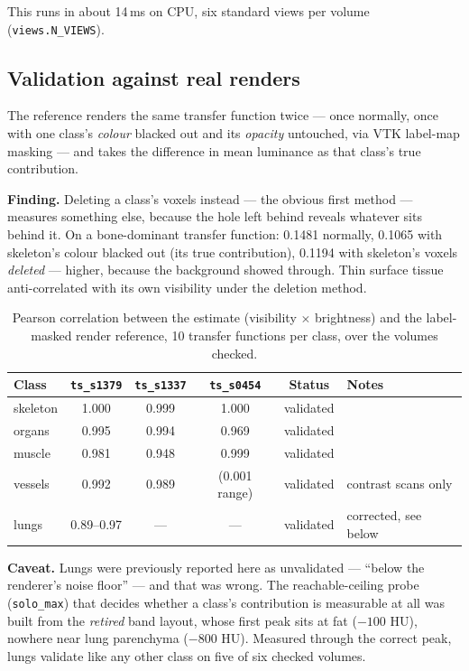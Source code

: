 \documentclass[10pt]{article}
\newcommand{\finding}[1]{\begin{findingbox}\textbf{Finding.} #1\end{findingbox}}
\newcommand{\caveattext}[1]{\begin{findingbox}[colframe=black!30]\textbf{Caveat.} #1\end{findingbox}}
\newcommand{\code}[1]{\texttt{#1}}
\begin{document}
This runs in about 14\,ms on CPU, six standard views per volume (\code{views.N\_VIEWS}).

\subsection{Validation against real renders}
\label{sec:validation}

The reference renders the same transfer function twice --- once normally,
once with one class's \emph{colour} blacked out and its \emph{opacity}
untouched, via VTK label-map masking --- and takes the difference in mean
luminance as that class's true contribution.

\finding{Deleting a class's voxels instead --- the obvious first method ---
measures something else, because the hole left behind reveals whatever sits
behind it. On a bone-dominant transfer function: 0.1481 normally, 0.1065 with
skeleton's colour blacked out (its true contribution), 0.1194 with
skeleton's voxels \emph{deleted} --- higher, because the background showed
through. Thin surface tissue anti-correlated with its own visibility under
the deletion method.}

\begin{table}[h]
\centering\small
\begin{tabular}{@{}lccccl@{}}
\toprule
\textbf{Class} & \code{ts\_s1379} & \code{ts\_s1337} & \code{ts\_s0454} & \textbf{Status} & \textbf{Notes} \\
\midrule
skeleton & 1.000 & 0.999 & 1.000 & validated & \\
organs & 0.995 & 0.994 & 0.969 & validated & \\
muscle & 0.981 & 0.948 & 0.999 & validated & \\
vessels & 0.992 & 0.989 & (0.001 range) & validated & contrast scans only \\
lungs & 0.89--0.97 & --- & --- & validated & corrected, see below \\
\bottomrule
\end{tabular}
\caption{Pearson correlation between the estimate (visibility $\times$
brightness) and the label-masked render reference, 10 transfer functions per
class, over the volumes checked.}
\end{table}

\caveattext{Lungs were previously reported here as unvalidated ---
``below the renderer's noise floor'' --- and that was wrong. The
reachable-ceiling probe (\code{solo\_max}) that decides whether a class's
contribution is measurable at all was built from the \emph{retired} band
layout, whose first peak sits at fat ($-100$ HU), nowhere near lung
parenchyma ($-800$ HU). Measured through the correct peak, lungs validate
like any other class on five of six checked volumes.}
\end{document}
